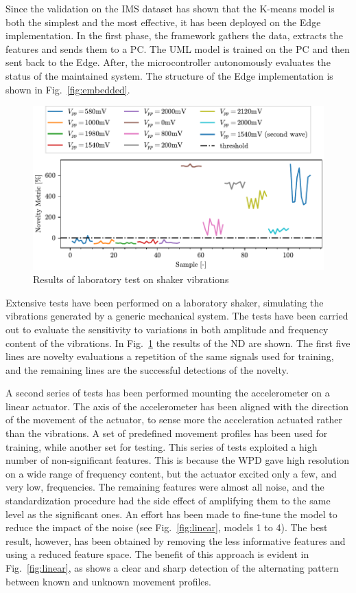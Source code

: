 Since the validation on the IMS dataset has shown that the K-means model is both the simplest and the most effective, it has been deployed on the Edge implementation. In the first phase, the framework gathers the data, extracts the features and sends them to a PC. The UML model is trained on the PC and then sent back to the Edge. After, the microcontroller autonomously evaluates the status of the maintained system. The structure of the Edge implementation is shown in Fig.~\ref{fig:embedded}.

\begin{figure}
    \includegraphics[width=\linewidth]{images/Test02_LOF.pdf}
    \caption{Results of laboratory test on shaker vibrations}
    \label{fig:shaker}
\end{figure}

Extensive tests have been performed on a laboratory shaker, simulating the vibrations generated by a generic mechanical system. The tests have been carried out to evaluate the sensitivity to variations in both amplitude and frequency content of the vibrations. In Fig.~\ref{fig:shaker} the results of the ND are shown. The first five lines are novelty evaluations a repetition of the same signals used for training, and the remaining lines are the successful detections of the novelty.

A second series of tests has been performed mounting the accelerometer on a linear actuator. The axis of the accelerometer has been aligned with the direction of the movement of the actuator, to sense more the acceleration actuated rather than the vibrations. A set of predefined movement profiles has been used for training, while another set for testing. This series of tests exploited a high number of non-significant features. This is because the WPD gave high resolution on a wide range of frequency content, but the actuator excited only a few, and very low, frequencies. The remaining features were almost all noise, and the standardization procedure had the side effect of amplifying them to the same level as the significant ones. An effort has been made to fine-tune the model to reduce the impact of the noise (see Fig.~\ref{fig:linear}, models 1 to 4). The best result, however, has been obtained by removing the less informative features and using a reduced feature space. The benefit of this approach is evident in Fig.~\ref{fig:linear}, as  shows a clear and sharp detection of the alternating pattern between known and unknown movement profiles.


